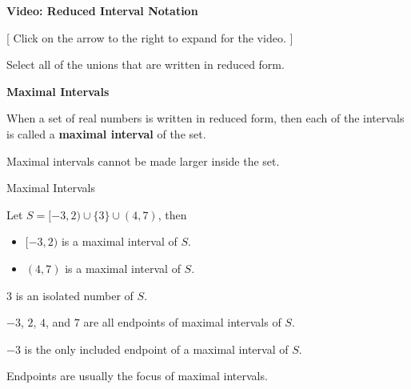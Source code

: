 \documentclass{ximera}
\begin{document}
\begin{onlineOnly}
\begin{explanation} \textbf{\textcolor{red!75!green}{Video: Reduced Interval Notation}}

[ Click on the arrow to the right to expand for the video. ]
\begin{expandable} 

\begin{center}
\end{center}

\end{expandable}

\end{explanation}
\end{onlineOnly}








\begin{question} 


Select all of the unions that are written in reduced form.
  \begin{selectAll}
  \choice {$[-3, 4) \cup (2, 7)$}
  \choice {$(-3, 2] \cup [4, 7] \cup \{ 3 \}$}
  \choice [correct]{$[-3, 2) \cup \{ 3 \} \cup (4, 7)$}
  \choice {$(4, 7) \cup [-3, 2)$}
  \end{selectAll}
\end{question}




\begin{definition} \textbf{\textcolor{green!50!black}{Maximal Intervals}}

When a set of real numbers is written in reduced form, then each of the intervals is called a \textbf{maximal interval} of the set.
\end{definition}
Maximal intervals cannot be made larger inside the set.  


\begin{example} Maximal Intervals 

Let $S = [-3, 2) \cup \{ 3 \} \cup (4, 7)$, then

\begin{itemize}
\item $[-3, 2)$ is a maximal interval of $S$.
\item $(4, 7)$ is a maximal interval of $S$.
\end{itemize}


$3$ is an isolated number of $S$.

$-3$, $2$, $4$, and $7$ are all endpoints of maximal intervals of $S$. 

$-3$ is the only included endpoint of a maximal interval of $S$.



\end{example}
Endpoints are usually the focus of maximal intervals.
\end{document}
